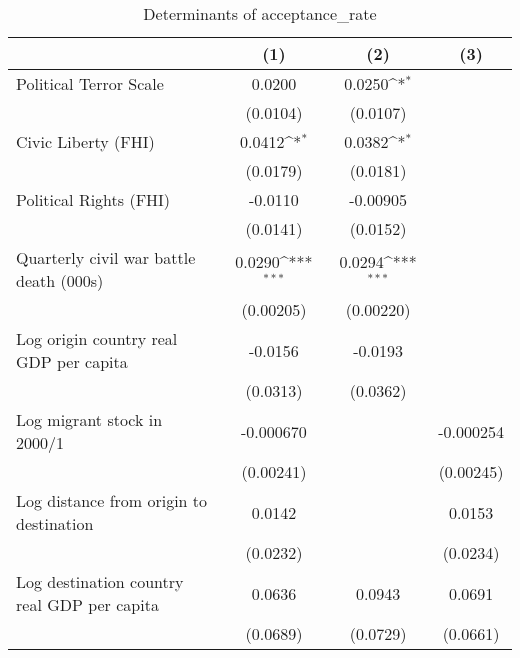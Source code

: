 \begin{table}[htbp]\centering
\def\sym#1{\ifmmode^{#1}\else\(^{#1}\)\fi}
\caption{Determinants of acceptance\_rate}
\begin{tabular}{l*{3}{c}}
\hline\hline
                    &\multicolumn{1}{c}{(1)}         &\multicolumn{1}{c}{(2)}         &\multicolumn{1}{c}{(3)}         \\
\hline
Political Terror Scale&      0.0200         &      0.0250\sym{*}  &                     \\
                    &    (0.0104)         &    (0.0107)         &                     \\
[1em]
Civic Liberty (FHI) &      0.0412\sym{*}  &      0.0382\sym{*}  &                     \\
                    &    (0.0179)         &    (0.0181)         &                     \\
[1em]
Political Rights (FHI)&     -0.0110         &    -0.00905         &                     \\
                    &    (0.0141)         &    (0.0152)         &                     \\
[1em]
Quarterly civil war battle death (000s)&      0.0290\sym{***}&      0.0294\sym{***}&                     \\
                    &   (0.00205)         &   (0.00220)         &                     \\
[1em]
Log origin country real GDP per capita&     -0.0156         &     -0.0193         &                     \\
                    &    (0.0313)         &    (0.0362)         &                     \\
[1em]
Log migrant stock in 2000/1&   -0.000670         &                     &   -0.000254         \\
                    &   (0.00241)         &                     &   (0.00245)         \\
[1em]
Log distance from origin to destination&      0.0142         &                     &      0.0153         \\
                    &    (0.0232)         &                     &    (0.0234)         \\
[1em]
Log destination country real GDP per capita&      0.0636         &      0.0943         &      0.0691         \\
                    &    (0.0689)         &    (0.0729)         &    (0.0661)         \\

\end{tabular}
\end{table}
